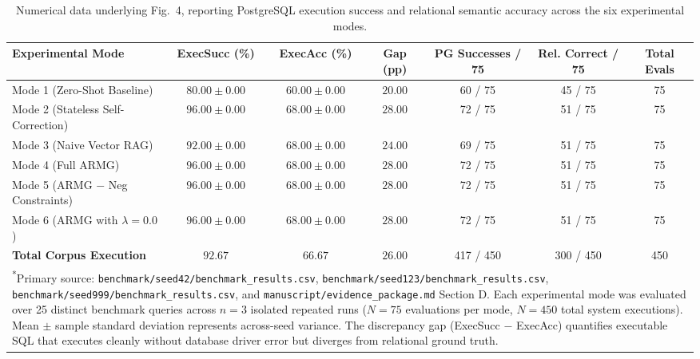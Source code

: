 \begin{table}[t]
\centering
\caption{Numerical data underlying Fig.~4, reporting PostgreSQL execution success and relational semantic accuracy across the six experimental modes.}
\label{tab:fig4_validation}
\begin{tabular}{lcccccc}
\toprule
\textbf{Experimental Mode} & \textbf{ExecSucc (\%)} & \textbf{ExecAcc (\%)} & \textbf{Gap (pp)} & \textbf{PG Successes / 75} & \textbf{Rel. Correct / 75} & \textbf{Total Evals} \\
\midrule
Mode 1 (Zero-Shot Baseline) & $80.00 \pm 0.00$ & $60.00 \pm 0.00$ & $20.00$ & 60 / 75 & 45 / 75 & 75 \\
Mode 2 (Stateless Self-Correction) & $96.00 \pm 0.00$ & $68.00 \pm 0.00$ & $28.00$ & 72 / 75 & 51 / 75 & 75 \\
Mode 3 (Naive Vector RAG) & $92.00 \pm 0.00$ & $68.00 \pm 0.00$ & $24.00$ & 69 / 75 & 51 / 75 & 75 \\
Mode 4 (Full ARMG) & $96.00 \pm 0.00$ & $68.00 \pm 0.00$ & $28.00$ & 72 / 75 & 51 / 75 & 75 \\
Mode 5 (ARMG $-$ Neg Constraints) & $96.00 \pm 0.00$ & $68.00 \pm 0.00$ & $28.00$ & 72 / 75 & 51 / 75 & 75 \\
Mode 6 (ARMG with $\lambda = 0.0$) & $96.00 \pm 0.00$ & $68.00 \pm 0.00$ & $28.00$ & 72 / 75 & 51 / 75 & 75 \\
\midrule
\textbf{Total Corpus Execution} & $92.67$ & $66.67$ & $26.00$ & 417 / 450 & 300 / 450 & 450 \\
\bottomrule
\multicolumn{7}{p{16.8cm}}{\footnotesize \textsuperscript{*}Primary source: \texttt{benchmark/seed42/benchmark\_results.csv}, \texttt{benchmark/seed123/benchmark\_results.csv}, \texttt{benchmark/seed999/benchmark\_results.csv}, and \texttt{manuscript/evidence\_package.md} Section D. Each experimental mode was evaluated over 25 distinct benchmark queries across $n = 3$ isolated repeated runs ($N = 75$ evaluations per mode, $N = 450$ total system executions). Mean $\pm$ sample standard deviation represents across-seed variance. The discrepancy gap (ExecSucc $-$ ExecAcc) quantifies executable SQL that executes cleanly without database driver error but diverges from relational ground truth.} \\
\end{tabular}
\end{table}
